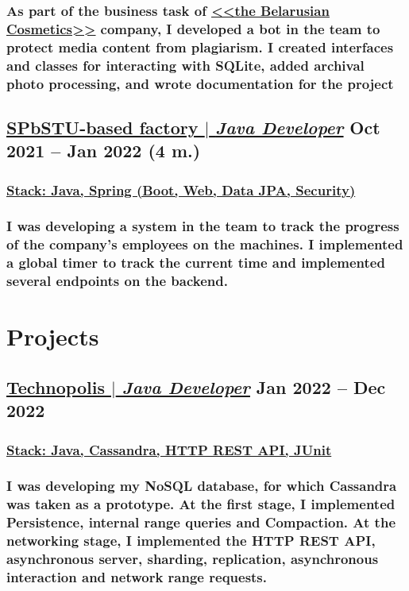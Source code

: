 \documentclass[11pt]{article}
\begin{document}
\subsubsection{As part of the business task of \href{https://www.wbc-c.ru/}{\underline{<<the Belarusian Cosmetics>>}} company, I developed a bot in the team to protect media content from plagiarism. I \textbf{created interfaces and classes for interacting with SQLite}, \textbf{added archival photo processing}, and wrote documentation for the project}
\begin{itemize}
\end{itemize}

\subsection{\href{https://github.com/martyn-fanclub/tracking-system}{\underline{SPbSTU-based factory $|$ {\normalfont\textit{Java Developer}}}} \hfill Oct 2021 -- Jan 2022 (4 m.)}
\subsubsection{\underline{\textbf{Stack}: Java, Spring (Boot, Web, Data JPA, Security)}}
\subsubsection{I was developing a system in the team to track the progress of the company's employees on the machines. I implemented \textbf{a global timer} to track the current time and \textbf{implemented several endpoints} on the backend.}
\begin{itemize}
\end{itemize}

\section{Projects}
\subsection{\href{https://github.com/polis-vk/2022-highload-dht/tree/main/src/main/java/ok/dht/test/kovalenko}{\underline{Technopolis $|$ {\normalfont\textit{Java Developer}}}} \hfill Jan 2022 -- Dec 2022}
\subsubsection{\underline{\textbf{Stack}: Java, Cassandra, HTTP REST API, JUnit}}
\subsubsection{I was developing \textbf{my NoSQL database}, for which Cassandra was taken as a prototype. At the first stage, I implemented \textbf{Persistence}, \textbf{internal range queries} and \textbf{Compaction}. At the networking stage, I implemented \textbf{the HTTP REST API, asynchronous server, sharding, replication, asynchronous interaction and network range requests.}}
\begin{itemize}
\end{itemize}
\end{document}
